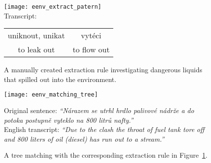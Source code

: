 \begin{figure}
	\centering
		\texttt{[image: eenv\_extract\_patern]}
\\Transcript:\\
\begin{tabular}{|c|c|}
\hline
uniknout, unikat & vytéci\\
to leak out & to flow out\\
\hline
\end{tabular}		
	\caption{A manually created extraction rule investigating dangerous liquids that spilled out into the environment.}
	\label{fig:ch50_eenv_extract_patern}
\end{figure}


\begin{figure}
	\centering
		\texttt{[image: eenv\_matching\_tree]}
		
Original sentence: 
\emph{``Nárazem se utrhl hrdlo palivové nádrže a do potoka postupně vyteklo na 800 litrů nafty.''}\\
English transcript: 
\emph{``Due to the clash the throat of fuel tank tore off and 800 liters of oil (diesel) has run out to a stream.''}
	\caption{A tree matching with the corresponding extraction rule in Figure~\ref{fig:ch50_eenv_extract_patern}.}
	\label{fig:ch50_eenv_matching_tree}
\end{figure}


